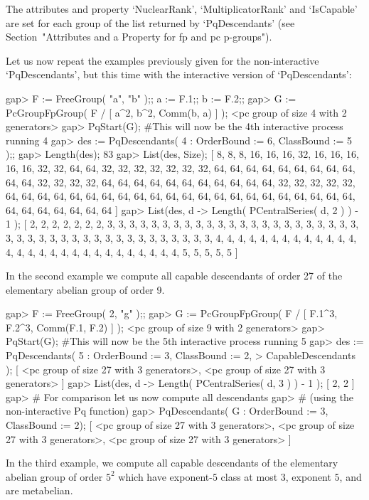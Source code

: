 The  attributes  and  property  `NuclearRank',  `MultiplicatorRank'   and
`IsCapable'  are  set  for  each  group   of   the   list   returned   by
`PqDescendants' (see Section~"Attributes and a Property  for  fp  and  pc
p-groups").

Let us now repeat the examples previously given for  the  non-interactive
`PqDescendants',  but  this  time  with  the   interactive   version   of
`PqDescendants':

\beginexample
gap> F := FreeGroup( "a", "b" );; a := F.1;; b := F.2;;
gap> G := PcGroupFpGroup( F / [ a^2, b^2, Comm(b, a) ] );
<pc group of size 4 with 2 generators>
gap> PqStart(G); #This will now be the 4th interactive process running
4
gap> des := PqDescendants( 4 : OrderBound := 6, ClassBound := 5 );;
gap> Length(des);
83
gap> List(des, Size);
[ 8, 8, 8, 16, 16, 16, 32, 16, 16, 16, 16, 16, 32, 32, 64, 64, 32, 32, 32, 
  32, 32, 32, 32, 64, 64, 64, 64, 64, 64, 64, 64, 64, 64, 64, 32, 32, 32, 32, 
  64, 64, 64, 64, 64, 64, 64, 64, 64, 64, 64, 32, 32, 32, 32, 32, 64, 64, 64, 
  64, 64, 64, 64, 64, 64, 64, 64, 64, 64, 64, 64, 64, 64, 64, 64, 64, 64, 64, 
  64, 64, 64, 64, 64, 64, 64 ]
gap> List(des, d -> Length( PCentralSeries( d, 2 ) ) - 1 );
[ 2, 2, 2, 2, 2, 2, 2, 3, 3, 3, 3, 3, 3, 3, 3, 3, 3, 3, 3, 3, 3, 3, 3, 3, 3, 
  3, 3, 3, 3, 3, 3, 3, 3, 3, 3, 3, 3, 3, 3, 3, 3, 3, 3, 3, 3, 3, 3, 3, 3, 4, 
  4, 4, 4, 4, 4, 4, 4, 4, 4, 4, 4, 4, 4, 4, 4, 4, 4, 4, 4, 4, 4, 4, 4, 4, 4, 
  4, 4, 4, 5, 5, 5, 5, 5 ]
\endexample

In the second example we compute all  capable descendants of order  27 of
the  elementary abelian group of order 9.  

\beginexample
gap> F := FreeGroup( 2, "g" );;                                 
gap> G := PcGroupFpGroup( F / [ F.1^3, F.2^3, Comm(F.1, F.2) ] );
<pc group of size 9 with 2 generators>
gap> PqStart(G); #This will now be the 5th interactive process running
5
gap> des := PqDescendants( 5 : OrderBound := 3, ClassBound := 2,
>                              CapableDescendants );
[ <pc group of size 27 with 3 generators>, 
  <pc group of size 27 with 3 generators> ]
gap> List(des, d -> Length( PCentralSeries( d, 3 ) ) - 1 );
[ 2, 2 ]
gap> # For comparison let us now compute all descendants
gap> # (using the non-interactive Pq function)
gap> PqDescendants( G : OrderBound := 3, ClassBound := 2);
[ <pc group of size 27 with 3 generators>, 
  <pc group of size 27 with 3 generators>, 
  <pc group of size 27 with 3 generators> ]
\endexample

In  the  third  example,  we  compute  all  capable  descendants  of  the
elementary abelian group of order  $5^2$ which have exponent-$5$ class at
most $3$, exponent $5$, and are metabelian.

